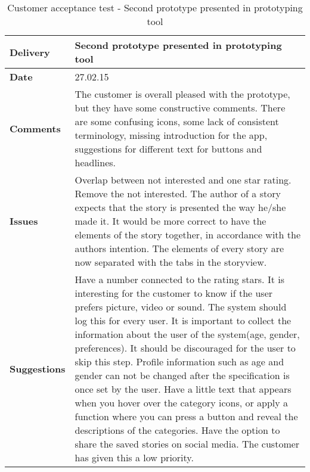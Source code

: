 \renewcommand{\arraystretch}{2}%
\begin{center}
	\begin{longtable}{ | p{4cm} | p{13cm} | }
		
		\caption[Customer acceptance test - Second prototype]{Customer acceptance test - Second prototype presented in prototyping tool} \label{Tab:cattest2}\\
		\hline
		\textbf{Delivery} & Second prototype presented in prototyping tool\\ \hline
		\textbf{Date} & 27.02.15 \\ \hline 
		\textbf{Comments}&
		The customer is overall pleased with the prototype, but they have some constructive comments. 
		There are some confusing icons, some lack of consistent terminology, missing introduction for the app, suggestions for different text for buttons and headlines.
		\\ \hline
		\textbf{Issues} 	 &	
		Overlap between not interested and one star rating. Remove the not interested. The author of a story expects that the story is presented the way he/she made it. It would be more correct to have the elements of the story together, in accordance with the authors intention. The elements of every story are now separated with the tabs in the storyview. 	 	
		\\ \hline
		\textbf{Suggestions} &
		 Have a number connected to the rating stars. It is interesting for the customer to know if the user prefers picture, video or sound. The system should log this for every user. It is important to collect the information about the user of the system(age, gender, preferences). It should be discouraged for the user to skip this step. Profile information such as age and gender can not be changed after the specification is once set by the user. Have a little text that appears when you hover over the category icons, or apply a function where you can press a button and reveal the descriptions of the categories. Have the option to share the saved stories on social media. The customer has given this a low priority.
		\\ \hline
	\end{longtable}
\end{center}

